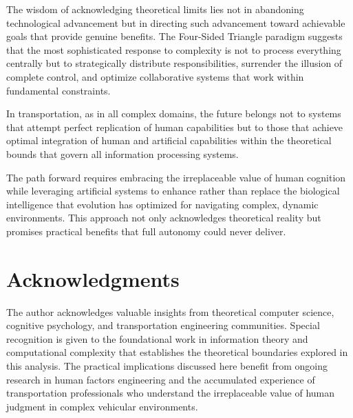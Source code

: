 \documentclass[12pt,a4paper]{article}
\begin{document}
The wisdom of acknowledging theoretical limits lies not in abandoning technological advancement but in directing such advancement toward achievable goals that provide genuine benefits. The Four-Sided Triangle paradigm suggests that the most sophisticated response to complexity is not to process everything centrally but to strategically distribute responsibilities, surrender the illusion of complete control, and optimize collaborative systems that work within fundamental constraints.

In transportation, as in all complex domains, the future belongs not to systems that attempt perfect replication of human capabilities but to those that achieve optimal integration of human and artificial capabilities within the theoretical bounds that govern all information processing systems.

The path forward requires embracing the irreplaceable value of human cognition while leveraging artificial systems to enhance rather than replace the biological intelligence that evolution has optimized for navigating complex, dynamic environments. This approach not only acknowledges theoretical reality but promises practical benefits that full autonomy could never deliver.

\section*{Acknowledgments}

The author acknowledges valuable insights from theoretical computer science, cognitive psychology, and transportation engineering communities. Special recognition is given to the foundational work in information theory and computational complexity that establishes the theoretical boundaries explored in this analysis. The practical implications discussed here benefit from ongoing research in human factors engineering and the accumulated experience of transportation professionals who understand the irreplaceable value of human judgment in complex vehicular environments.
\end{document}
